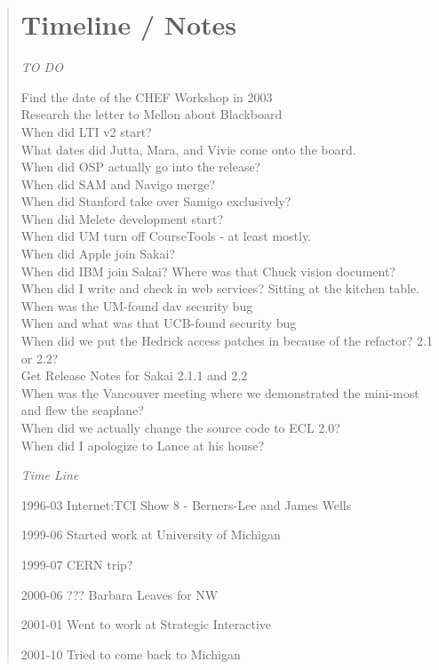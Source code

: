 \begin{quote}

\chapter{Timeline / Notes}

\emph{TO DO}

Find the date of the CHEF Workshop in 2003\\
Research the letter to Mellon about Blackboard \\
When did LTI v2 start?\\
What dates did Jutta, Mara, and Vivie come onto the board.\\
When did OSP actually go into the release?\\
When did SAM and Navigo merge?\\
When did Stanford take over Samigo exclusively?\\
When did Melete development start?\\
When did UM turn off CourseTools - at least mostly.\\
When did Apple join Sakai?\\
When did IBM join Sakai? Where was that Chuck vision document?\\
When did I write and check in web services?  Sitting at the kitchen table.\\
When was the UM-found dav security bug\\
When and what was that UCB-found security bug\\
When did we put the Hedrick access patches in because of the refactor?  2.1 or 2.2?\\
Get Release Notes for Sakai 2.1.1 and 2.2\\
When was the Vancouver meeting where we demonstrated the mini-most and flew the seaplane?\\
When did we actually change the source code to ECL 2.0?\\
When did I apologize to Lance at his house?

\emph{Time Line}

1996-03 Internet:TCI Show 8 - Berners-Lee and James Wells

1999-06 Started work at University of Michigan

1999-07 CERN trip?

2000-06 ??? Barbara Leaves for NW

2001-01 Went to work at Strategic Interactive

2001-10 Tried to come back to Michigan 


\end{quote}
